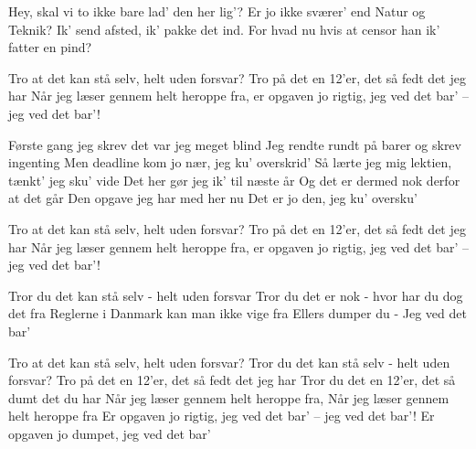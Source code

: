 \documentclass[a4paper,11pt]{article}
\begin{document}
\begin{song}
 Hey, skal vi to ikke bare lad’ den her lig’?
Er jo ikke sværer’ end Natur og Teknik?
Ik’ send afsted, ik’ pakke det ind.
For hvad nu hvis at censor han ik’ fatter en pind?

Tro at det kan stå selv, helt uden forsvar?
Tro på det en 12’er, det så fedt det jeg har
Når jeg læser gennem helt heroppe fra,
er opgaven jo rigtig, jeg ved det bar’ – jeg ved det bar’!

Første gang jeg skrev det var jeg meget blind
Jeg rendte rundt på barer og skrev ingenting
Men deadline kom jo nær, jeg ku’ overskrid’ 
Så lærte jeg mig lektien, tænkt’ jeg sku’ vide
Det her gør jeg ik’ til næste år
Og det er dermed nok derfor at det går
Den opgave jeg har med her nu
Det er jo den, jeg ku’ oversku’

Tro at det kan stå selv, helt uden forsvar?
Tro på det en 12’er, det så fedt det jeg har
Når jeg læser gennem helt heroppe fra,
er opgaven jo rigtig, jeg ved det bar’ – jeg ved det bar’!

 Tror du det kan stå selv - helt uden forsvar
Tror du det er nok - hvor har du dog det fra
Reglerne i Danmark kan man ikke vige fra
Ellers dumper du - Jeg ved det bar'

 Tro at det kan stå selv, helt uden forsvar?
 Tror du det kan stå selv - helt uden forsvar?
 Tro på det en 12’er, det så fedt det jeg har
 Tror du det en 12’er, det så dumt det du har
 Når jeg læser gennem helt heroppe fra,
 Når jeg læser gennem helt heroppe fra
 Er opgaven jo rigtig, jeg ved det bar’ – jeg ved det bar’!
 Er opgaven jo dumpet, jeg ved det bar’
\end{song}
\end{document}
